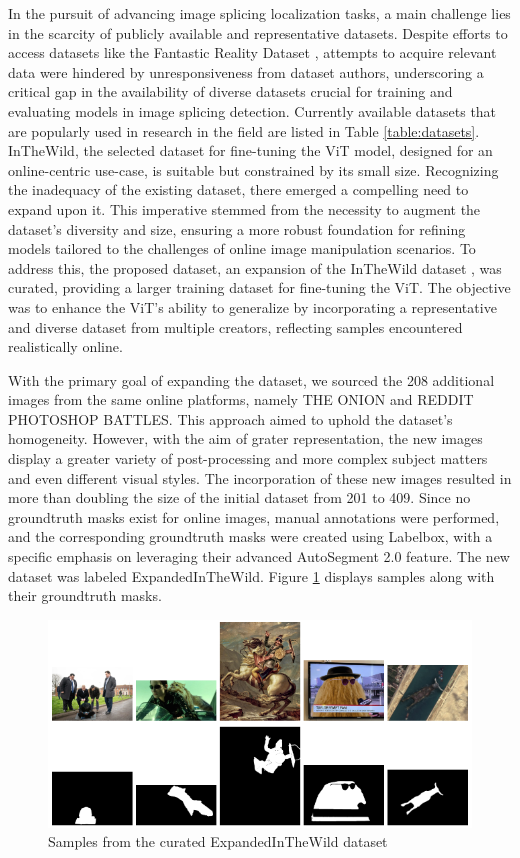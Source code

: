 In the pursuit of advancing image splicing localization tasks, a main challenge lies in the scarcity of publicly available and representative datasets. Despite efforts to access datasets like the Fantastic Reality Dataset \cite{Kniaz2019ThePW}, attempts to acquire relevant data were hindered by unresponsiveness from dataset authors, underscoring a critical gap in the availability of diverse datasets crucial for training and evaluating models in image splicing detection. Currently available datasets that are popularly used in research in the field are listed in Table \ref{table:datasets}. InTheWild, the selected dataset for fine-tuning the ViT model, designed for an online-centric use-case, is suitable but constrained by its small size. Recognizing the inadequacy of the existing dataset, there emerged a compelling need to expand upon it. This imperative stemmed from the necessity to augment the dataset's diversity and size, ensuring a more robust foundation for refining models tailored to the challenges of online image manipulation scenarios. To address this, the proposed dataset, an expansion of the InTheWild dataset \cite{huh2018fighting}, was curated, providing a larger training dataset for fine-tuning the ViT. The objective was to enhance the ViT's ability to generalize by incorporating a representative and diverse dataset from multiple creators, reflecting samples encountered realistically online.

With the primary goal of expanding the dataset, we sourced the 208 additional images from the same online platforms, namely THE ONION and REDDIT PHOTOSHOP BATTLES. This approach aimed to uphold the dataset's homogeneity. However, with the aim of grater representation, the new images display a greater variety of post-processing and more complex subject matters and even different visual styles. The incorporation of these new images resulted in more than doubling the size of the initial dataset from 201 to 409. Since no groundtruth masks exist for online images, manual annotations were performed, and the corresponding groundtruth masks were created using Labelbox, with a specific emphasis on leveraging their advanced AutoSegment 2.0 feature. The new dataset was labeled ExpandedInTheWild. Figure \ref{fig:expanded} displays samples along with their groundtruth masks.

\begin{figure}[!h]
    \centering
    \includegraphics[width=0.75\linewidth]{EITW.png}
    \caption{Samples from the curated ExpandedInTheWild dataset}
    \label{fig:expanded}
\end{figure}

